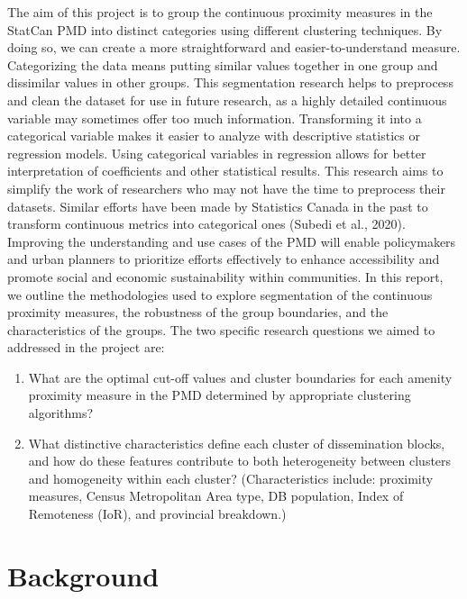 \documentclass[11pt, a4paper]{article}
\begin{document}
The aim of this project is to group the continuous proximity measures in the StatCan PMD into distinct categories using different clustering techniques. By doing so, we can create a more straightforward and easier-to-understand measure. Categorizing the data means putting similar values together in one group and dissimilar values in other groups. This segmentation research helps to preprocess and clean the dataset for use in future research, as a highly detailed continuous variable may sometimes offer too much information. Transforming it into a categorical variable makes it easier to analyze with descriptive statistics or regression models. Using categorical variables in regression allows for better interpretation of coefficients and other statistical results. This research aims to simplify the work of researchers who may not have the time to preprocess their datasets. Similar efforts have been made by Statistics Canada in the past to transform continuous metrics into categorical ones (Subedi et al., 2020). Improving the understanding and use cases of the PMD will enable policymakers and urban planners to prioritize efforts effectively to enhance accessibility and promote social and economic sustainability within communities. In this report, we outline the methodologies used to explore segmentation of the continuous proximity measures, the robustness of the group boundaries, and the characteristics of the groups.
The two specific research questions we aimed to addressed in the project are:

\begin{enumerate}
\item What are the optimal cut-off values and cluster boundaries for each amenity proximity measure in the PMD determined by appropriate clustering algorithms?
\item What distinctive characteristics define each cluster of dissemination blocks, and how do these features contribute to both heterogeneity between clusters and homogeneity within each cluster? (Characteristics include: proximity measures, Census Metropolitan Area type, DB population, Index of Remoteness (IoR), and provincial breakdown.)
\end{enumerate}








\pagebreak
\section{Background}
\end{document}
